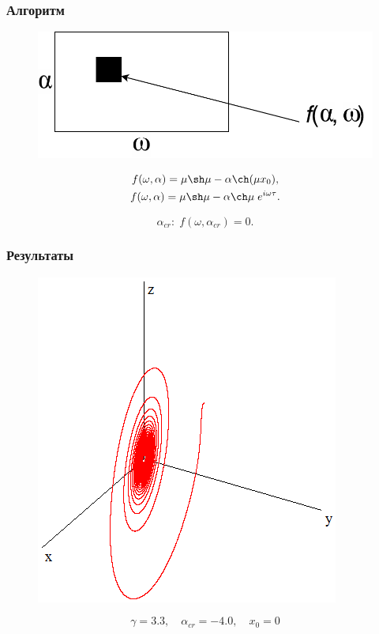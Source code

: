\documentclass[fullscreen=true, unicode, bookmarks=false]{beamer}
\begin{document}
\begin{frame}
\frametitle{ Алгоритм } 

\begin{figure} 
\includegraphics[scale=0.6]{Diagram.pdf}  
\end{figure}

\pause

\begin{gather}\label{eq9}	
	f(\omega, \alpha) = \mu \sh \mu - \alpha \ch(\mu x_0), \\
	f(\omega, \alpha) = \mu \sh \mu - \alpha \ch \mu \; e^{i \omega \tau}. \nonumber
\end{gather}

\pause

$$ \alpha_{cr}: \; f(\omega, \alpha_{cr}) = 0. $$

\end{frame}


\begin{frame}

\frametitle{Результаты} 

\begin{figure}
\includegraphics[scale=0.55]{AHB.png} 
\end{figure}
{\footnotesize $$ \gamma = 3.3, \quad \alpha_{cr} = -4.0, \quad x_0 = 0 $$}

\end{frame}
\end{document}
